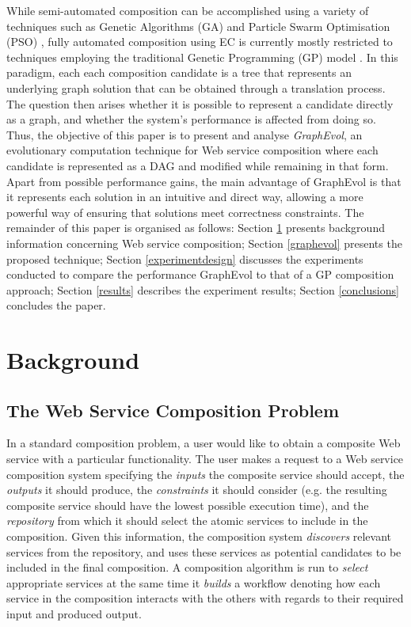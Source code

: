 \documentclass{article}
\begin{document}
While semi-automated composition can be accomplished using a variety of techniques such as Genetic Algorithms (GA) and Particle Swarm Optimisation
(PSO) \cite{silva2014graph}, fully automated composition using EC is currently mostly restricted to techniques employing the traditional Genetic Programming (GP) model \cite{rodriguez2010composition}.
In this paradigm, each each composition candidate is a tree that represents an underlying graph solution that can be obtained through a translation
process. The question then arises whether it is possible to represent a candidate directly as a graph, and whether the system's performance is affected
from doing so. Thus, the objective of this paper is to present and analyse \textit{GraphEvol}, an evolutionary computation technique for Web service
composition where each candidate is represented as a DAG and modified while remaining in that form. Apart from possible performance gains, the main
advantage of GraphEvol is that it represents each solution in an intuitive and direct way, allowing a more powerful way of ensuring that solutions
meet correctness constraints. The remainder of this paper is organised as follows:
Section \ref{background} presents background information concerning Web service composition; Section \ref{graphevol} presents the proposed technique;
Section \ref{experimentdesign} discusses the experiments conducted to compare the performance GraphEvol to that of a GP composition approach;
Section \ref{results} describes the experiment results; Section \ref{conclusions} concludes the paper.

\section{Background}\label{background}

\subsection{The Web Service Composition Problem}

In a standard composition problem, a user would like to obtain a composite Web service with a particular functionality. The user makes a request to a Web
service composition system specifying the \textit{inputs} the composite service should accept, the \textit{outputs} it should produce, the \textit{constraints}
it should consider (e.g. the resulting composite service should have the lowest possible execution time), and the \textit{repository} from which it should select
the atomic services to include in the composition. Given this information, the composition system \textit{discovers} relevant services from the repository, and uses
these services as potential candidates to be included in the final composition. A composition algorithm is run to \textit{select} appropriate services at the same
time it \textit{builds} a workflow denoting how each service in the composition interacts with the others with regards to their required input and produced output.
\end{document}
